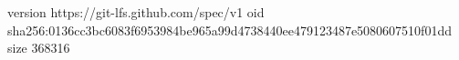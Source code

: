 version https://git-lfs.github.com/spec/v1
oid sha256:0136cc3bc6083f6953984be965a99d4738440ee479123487e5080607510f01dd
size 368316

